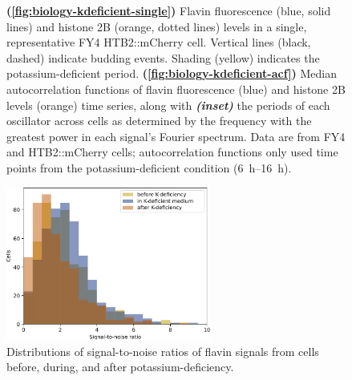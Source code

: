 \begin{figure}
  \caption[
    Flavin fluorescence and histone 2B levels in a single, representative FY4 HTB2::mCherry cell.
    Median autocorrelation functions of flavin fluorescence and histone 2B levels time series, along with  the periods of each oscillator across cells.
    Data are from FY4 and HTB2::mCherry cells; autocorrelation functions only used time points from the potassium-deficient condition.
  ]{
    \textbf{(\ref{fig:biology-kdeficient-single})}
    Flavin fluorescence (blue, solid lines) and histone 2B (orange, dotted lines) levels in a single, representative FY4 HTB2::mCherry cell.
    Vertical lines (black, dashed) indicate budding events.
    Shading (yellow) indicates the potassium-deficient period.
    \textbf{(\ref{fig:biology-kdeficient-acf})}
    Median autocorrelation functions of flavin fluorescence (blue) and histone 2B levels (orange) time series, along with \textit{\textbf{(inset)}} the periods of each oscillator across cells as determined by the frequency with the greatest power in each signal's Fourier spectrum.
    Data are from FY4 and HTB2::mCherry cells; autocorrelation functions only used time points from the potassium-deficient condition (\SIrange{6}{16}{\hour}).
  }
  \label{fig:biology-kdeficient}
\end{figure}


\begin{figure}
  \centering
   \includegraphics[width=0.6\textwidth]{kdeficient_snr_edit.pdf}
   \caption{
     Distributions of signal-to-noise ratios of flavin signals from cells before, during, and after potassium-deficiency.
   }
  \label{fig:biology-kdeficient-snr}
\end{figure}


